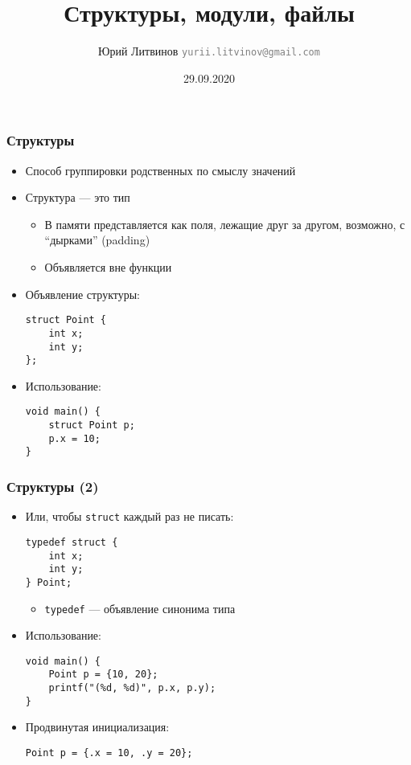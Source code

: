 \documentclass[xetex,mathserif,serif]{beamer}
\title{Структуры, модули, файлы}
\author[Юрий Литвинов]{Юрий Литвинов \newline \textcolor{gray}{\small\texttt{yurii.litvinov@gmail.com}}}
\date{29.09.2020}
\begin{document}
    
    \frame{\titlepage}
    
    \begin{frame}[fragile]
        \frametitle{Структуры}
        \begin{itemize}
            \item Способ группировки родственных по смыслу значений
            \item Структура --- это тип
            \begin{itemize}
                \item В памяти представляется как поля, лежащие друг за другом, возможно, с ``дырками'' (padding)
                \item Объявляется вне функции
            \end{itemize}
            \item Объявление структуры:
            \begin{verbatim}
struct Point {
    int x;
    int y;
};
            \end{verbatim}
            \item Использование:
            \begin{verbatim}
void main() {
    struct Point p;
    p.x = 10;
}
            \end{verbatim}
        \end{itemize}
    \end{frame}

    \begin{frame}[fragile]
        \frametitle{Структуры (2)}
        \begin{itemize}
            \item Или, чтобы \texttt{struct} каждый раз не писать:
            \begin{verbatim}
typedef struct {
    int x;
    int y;
} Point;
            \end{verbatim}
            \begin{itemize}
                \item \texttt{typedef} --- объявление синонима типа
            \end{itemize}
            \item Использование:
            \begin{verbatim}
void main() {
    Point p = {10, 20};
    printf("(%d, %d)", p.x, p.y);
}
            \end{verbatim}
            \item Продвинутая инициализация:
            \begin{verbatim}
Point p = {.x = 10, .y = 20};
            \end{verbatim}
        \end{itemize}
    \end{frame}
\end{document}
